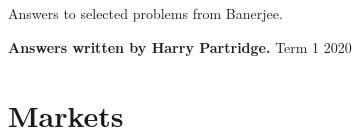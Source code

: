 \documentclass[a4paper]{article}
\begin{document}
\begin{titlepage}
    \begin{center}
    \vspace*{15em}
    \vspace{2em}

    \begin{Large}
    Answers to selected problems from Banerjee.
    \end{Large}

    \vspace{1em}
    \textbf{Answers written by Harry Partridge.}
    \vfill
    Term 1 2020
    \end{center}
\end{titlepage} 

\tableofcontents
\section{Markets}
\end{document}
